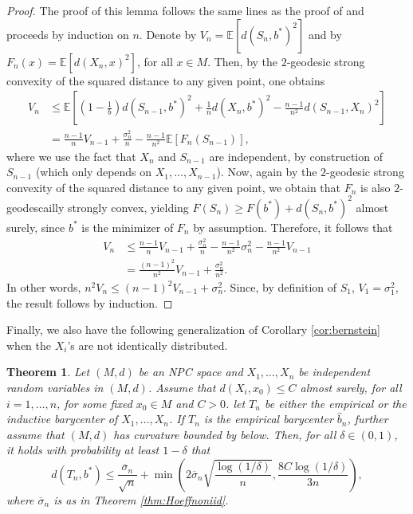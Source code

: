 \documentclass[10pt,a4paper]{article}
\theoremstyle{plain}
\newtheorem{theorem}{Theorem}[section]
\theoremstyle{definition}
\theoremstyle{remark}
\newcommand{\E}{\mathbb{E}}
\begin{document}
\begin{proof}
    The proof of this lemma follows the same lines as the proof of \cite[Theorem 4.7]{sturm03} and proceeds by induction on $n$. Denote by $V_n=\E[d(S_n,b^*)^2]$ and by $F_n(x)=\E[d(X_n,x)^2]$, for all $x\in M$. Then, by the $2$-geodesic strong convexity of the squared distance to any given point, one obtains
    \begin{align*}
        V_n & \leq \E\left[\left(1-\frac{1}{b}\right)d(S_{n-1},b^*)^2+\frac{1}{n}d(X_n,b^*)^2-\frac{n-1}{n^2}d(S_{n-1},X_n)^2\right] \\
        & = \frac{n-1}{n}V_{n-1}+\frac{\sigma_n^2}{n}-\frac{n-1}{n^2}\E[F_n(S_{n-1})],
    \end{align*}
    where we use the fact that $X_n$ and $S_{n-1}$ are independent, by construction of $S_{n-1}$ (which only depends on $X_1,\ldots,X_{n-1}$). Now, again by the $2$-geodesic strong convexity of the squared distance to any given point, we obtain that $F_n$ is also $2$-geodescailly strongly convex, yielding $F(S_n)\geq F(b^*)+d(S_n,b^*)^2$ almost surely, since $b^*$ is the minimizer of $F_n$ by assumption. Therefore, it follows that 
    \begin{align*}
        V_n & \leq \frac{n-1}{n}V_{n-1}+\frac{\sigma_n^2}{n}-\frac{n-1}{n^2}\sigma_n^2-\frac{n-1}{n^2}V_{n-1} \\
        & = \frac{(n-1)^2}{n^2}V_{n-1}+\frac{\sigma_n^2}{n^2}.
    \end{align*}
    In other words, $n^2V_n\leq (n-1)^2V_{n-1}+\sigma_n^2$. Since, by definition of $S_1$, $V_1=\sigma_1^2$, the result follows by induction. 
    
\end{proof}

Finally, we also have the following generalization of Corollary \ref{cor:bernstein} when the $X_i$'s are not identically distributed.

\begin{theorem} \label{thm:Bernsteinnoniid}
    Let $(M,d)$ be an NPC space and $X_1,\ldots,X_n$ be independent random variables in $(M,d)$. Assume that $d(X_i,x_0)\leq C$ almost surely, for all $i=1,\ldots,n$, for some fixed $x_0\in M$ and $C>0$. let $T_n$ be either the empirical or the inductive barycenter of $X_1,\ldots,X_n$. If $T_n$ is the empirical barycenter $\hat b_n$, further assume that $(M,d)$ has curvature bounded by below. Then, for all $\delta\in (0,1)$, it holds with probability at least $1-\delta$ that 
    $$d(T_n,b^*)\leq \frac{\overline\sigma_n}{\sqrt{n}}+\min\left(2\overline\sigma_n\sqrt{\frac{\log(1/\delta)}{n}},\frac{8C\log(1/\delta)}{3n}\right),$$
    where $\overline\sigma_n$ is as in Theorem \ref{thm:Hoeffnoniid}.
\end{theorem}
\end{document}
